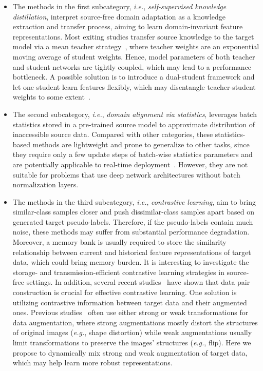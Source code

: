 \documentclass[10pt,journal,compsoc]{IEEEtran}
\def\eg{{\em e.g.}}
\def\ie{{\em i.e.}}
\begin{document}
\begin{itemize}[leftmargin=*]%
\item
The methods in the first subcategory, \ie, \emph{self-supervised knowledge distillation}, interpret source-free domain adaptation as a knowledge extraction and transfer process, aiming to learn domain-invariant feature representations.
Most exiting studies transfer source knowledge to the target model via a mean teacher strategy~\cite{tarvainen2017mean}, where teacher weights are an exponential moving average of student weights.
Hence, model parameters of both teacher and student networks are tightly coupled, which may lead to a performance bottleneck.
A possible solution is to introduce a dual-student framework and let one student learn features flexibly, which may disentangle teacher-student weights to some extent~\cite{ke2019dualstu}.


\item The second subcategory, \ie, \emph{domain alignment via statistics}, leverages batch statistics stored in a pre-trained source model to approximate distribution of inaccessible source data.
Compared with other categories, these statistics-based methods are lightweight and prone to generalize to other tasks, since they require only a few update steps of batch-wise statistics parameters and are potentially applicable to real-time deployment~\cite{klingner2022unsupervised}.
However, they are not suitable for problems that use deep network architectures without batch normalization layers. 


\item The methods in the third subcategory, \ie, \emph{contrastive learning}, aim to bring similar-class samples closer and push dissimilar-class samples apart based on generated target pseudo-labels.
Therefore, if the pseudo-labels contain much noise, these methods may suffer from substantial performance degradation.
Moreover, a memory bank is usually required to store the similarity relationship between current and historical feature representations of target data, which could bring memory burden.
It is interesting to investigate the storage- and transmission-efficient contrastive learning strategies in source-free settings.
In addition, several recent studies~\cite{chen2020simple, he2020momentum} have shown that data pair construction is crucial for effective contrastive learning.
One solution is utilizing contrastive information between target data and their augmented ones.
Previous studies~\cite{chen2020simpleaug} often use either strong or weak transformations for data augmentation, where strong augmentations mostly distort the structures of original images (\eg, shape distortion) while weak augmentations usually limit transformations to preserve the images' structures (\eg, flip).
Here we propose to dynamically mix strong and weak augmentation of target data, which may help learn more robust representations.



\end{itemize}
\end{document}
